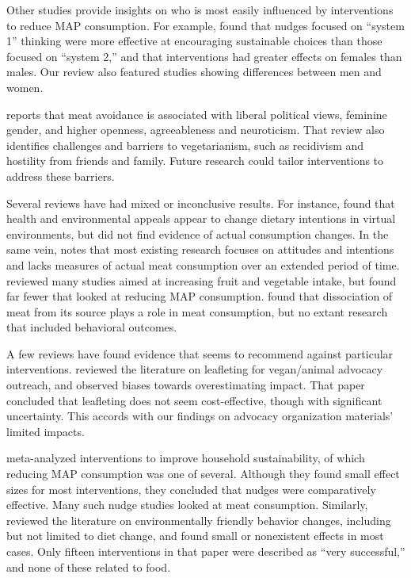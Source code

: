 \documentclass[sn-nature,referee,pdflatex]{sn-jnl}
\begin{document}
Other studies provide insights on who is most easily influenced by
interventions to reduce MAP consumption. For example,
\citep{blackford2021} found that nudges focused on ``system 1'' thinking
were more effective at encouraging sustainable choices than those
focused on ``system 2,'' and that interventions had greater effects on
females than males. Our review also featured studies showing differences
between men and women.

\citep{rosenfeld2018} reports that meat avoidance is associated with
liberal political views, feminine gender, and higher openness,
agreeableness and neuroticism. That review also identifies challenges
and barriers to vegetarianism, such as recidivism and hostility from
friends and family. Future research could tailor interventions to
address these barriers.

Several reviews have had mixed or inconclusive results. For instance,
\citep{bianchi2018conscious} found that health and environmental appeals
appear to change dietary intentions in virtual environments, but did not
find evidence of actual consumption changes. In the same vein,
\citep{kwasny2022} notes that most existing research focuses on
attitudes and intentions and lacks measures of actual meat consumption
over an extended period of time. \citep{taufik2019} reviewed many
studies aimed at increasing fruit and vegetable intake, but found far
fewer that looked at reducing MAP consumption. \citep{benningstad2020}
found that dissociation of meat from its source plays a role in meat
consumption, but no extant research that included behavioral outcomes.

A few reviews have found evidence that seems to recommend against
particular interventions. \citep{greig2017} reviewed the literature on
leafleting for vegan/animal advocacy outreach, and observed biases
towards overestimating impact. That paper concluded that leafleting does
not seem cost-effective, though with significant uncertainty. This
accords with our findings on advocacy organization materials' limited
impacts.

\citep{nisa2019} meta-analyzed interventions to improve household
sustainability, of which reducing MAP consumption was one of several.
Although they found small effect sizes for most interventions, they
concluded that nudges were comparatively effective. Many such nudge
studies looked at meat consumption. Similarly, \citep{rau2022} reviewed
the literature on environmentally friendly behavior changes, including
but not limited to diet change, and found small or nonexistent effects
in most cases. Only fifteen interventions in that paper were described
as ``very successful,'' and none of these related to food.
\end{document}
